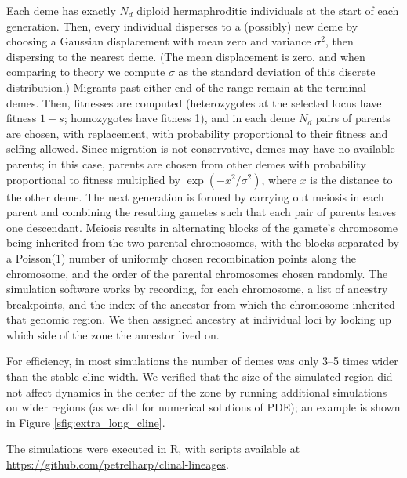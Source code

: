 \documentclass[11pt,letterpaper]{article}
\begin{document}
Each deme has exactly $N_d$ diploid hermaphroditic individuals at the start of each generation.
Then, every individual disperses to a (possibly) new deme
by choosing a Gaussian displacement with mean zero and variance $\sigma^2$,
then dispersing to the nearest deme. 
(The mean displacement is zero, and when comparing to theory we compute $\sigma$ as the standard deviation of this discrete distribution.)
Migrants past either end of the range remain at the terminal demes.
Then, 
fitnesses are computed (heterozygotes at the selected locus have fitness $1-s$; homozygotes have fitness 1),
and in each deme $N_d$ pairs of parents are chosen, with replacement,
with probability proportional to their fitness and selfing allowed.
Since migration is not conservative, demes may have no available parents;
in this case, parents are chosen from other demes with probability proportional to fitness
multiplied by $\exp(-x^2/\sigma^2)$, where $x$ is the distance to the other deme. 
The next generation is formed by carrying out meiosis in each parent
and combining the resulting gametes such that each pair of parents leaves one descendant.
Meiosis results in alternating blocks of the gamete's chromosome
being inherited from the two parental chromosomes,
with the blocks separated by a Poisson(1) number of uniformly chosen recombination points along the chromosome,
and the order of the parental chromosomes chosen randomly.
The simulation software works by recording, for each chromosome, 
a list of ancestry breakpoints, and the index of the ancestor from which 
the chromosome inherited that genomic region.
We then assigned ancestry at individual loci by looking up which side of the zone the ancestor lived on.

For efficiency, in most simulations the number of demes was only 3--5 times wider than the stable cline width. 
We verified that the size of the simulated region did not affect dynamics in the center of the zone
by running additional simulations on wider regions
(as we did for numerical solutions of PDE);
an example is shown in Figure \ref{sfig:extra_long_cline}.

The simulations were executed in R, with scripts available at
\url{https://github.com/petrelharp/clinal-lineages}.
\end{document}
